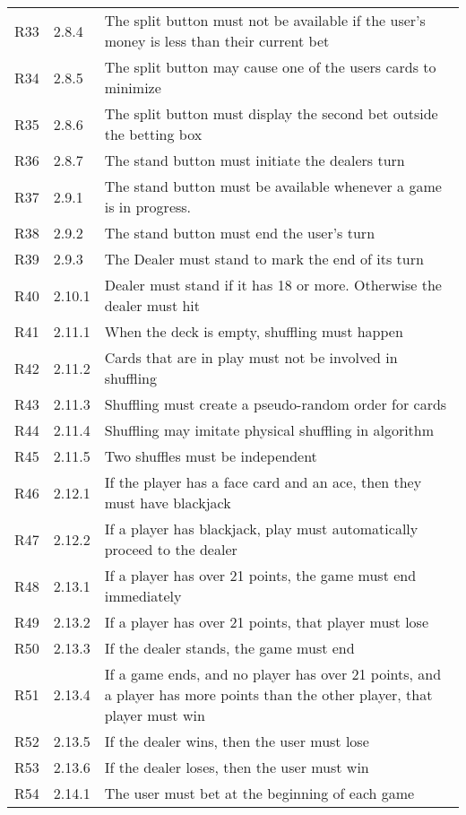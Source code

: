 \documentclass [landscape, 12pt] {article}
\begin{document}
\begin {longtable}{p{4cm}p{3cm}p{10cm}}
			R33 & 2.8.4 & The split button must not be available if the user's money is less than their current bet\\
			R34 & 2.8.5 & The split button may cause one of the users cards to minimize\\
			R35 & 2.8.6 & The split button must display the second bet outside the betting box\\
			R36 & 2.8.7 & The stand button must initiate the dealers turn\\
			R37 & 2.9.1 & The stand button must be available whenever a game is in progress.\\
			R38 & 2.9.2 & The stand button must end the user's turn\\
			R39 & 2.9.3  & The Dealer must stand to mark the end of its turn\\
			R40 & 2.10.1 & Dealer must stand if it has 18 or more.  Otherwise the dealer must hit\\
			R41 & 2.11.1 & When the deck is empty, shuffling must happen\\
			R42 & 2.11.2 & Cards that are in play must not be involved in shuffling\\
			R43 & 2.11.3 & Shuffling must create a pseudo-random order for cards\\
			R44 & 2.11.4 & Shuffling may imitate physical shuffling in algorithm\\
			R45 & 2.11.5 & Two shuffles must be independent\\
			R46 & 2.12.1 & If the player has a face card and an ace, then they must have blackjack\\
			R47 & 2.12.2 & If a player has blackjack, play must automatically proceed to the dealer\\
			R48 & 2.13.1 & If a player has over 21 points, the game must end immediately\\
			R49 & 2.13.2 & If a player has over 21 points, that player must lose\\
			R50 & 2.13.3 &  If the dealer stands, the game must end\\
			R51 & 2.13.4 & If a game ends, and no player has over 21 points, and a player has more points than the other player, that player must win\\
			R52 & 2.13.5 & If the dealer wins, then the user must lose\\
			R53 & 2.13.6 & If the dealer loses, then the user must win\\
			R54 & 2.14.1 & The user must bet at the beginning of each game\\

\end{longtable}
\end{document}
